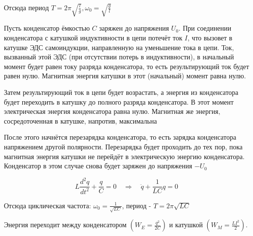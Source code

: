 Отсюда период $T = 2\pi\sqrt{\frac{l}{g}}, \omega_0 = \sqrt{\frac{g}{l}}$

Пусть конденсатор ёмкостью $C$ заряжен до напряжения $U_0$. 
При соединении конденсатора с катушкой индуктивности в цепи потечёт ток $I$, 
что вызовет в катушке ЭДС самоиндукции, направленную на уменьшение тока в цепи. 
Ток, вызванный этой ЭДС (при отсутствии потерь в индуктивности), 
в начальный момент будет равен току разряда конденсатора, то есть результирующий ток будет равен нулю. 
Магнитная энергия катушки в этот (начальный) момент равна нулю.

Затем результирующий ток в цепи будет возрастать, а энергия из конденсатора будет переходить 
в катушку до полного разряда конденсатора. В этот момент электрическая энергия конденсатора равна нулю. 
Магнитная же энергия, сосредоточенная в катушке, напротив, максимальна

После этого начнётся перезарядка конденсатора, то есть зарядка конденсатора напряжением другой полярности. 
Перезарядка будет проходить до тех пор, пока магнитная энергия катушки не перейдёт в электрическую энергию 
конденсатора. Конденсатор в этом случае снова будет заряжен до напряжения $-U_0$

\[
L\frac{d^2q}{dt^2} + \frac{q}{C} = 0 \quad \Longrightarrow \quad \ddot{q} + \frac{1}{LC}q = 0
\]

Отсюда циклическая частота: $\omega_0 = \frac{1}{\sqrt{LC}}$, период - $T = 2\pi\sqrt{LC}$

Энергия переходит между конденсатором $\left(W_E = \frac{q^2}{2C}\right)$ и катушкой $\left(W_M = \frac{LI^2}{2}\right)$.


